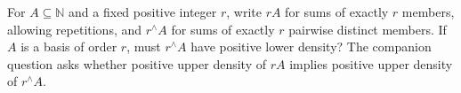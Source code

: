 For $A\subseteq\mathbb N$ and a fixed positive integer $r$, write $rA$ for sums of exactly $r$ members, allowing repetitions, and $r^{\wedge}A$ for sums of exactly $r$ pairwise distinct members. If $A$ is a basis of order $r$, must $r^{\wedge}A$ have positive lower density? The companion question asks whether positive upper density of $rA$ implies positive upper density of $r^{\wedge}A$.
